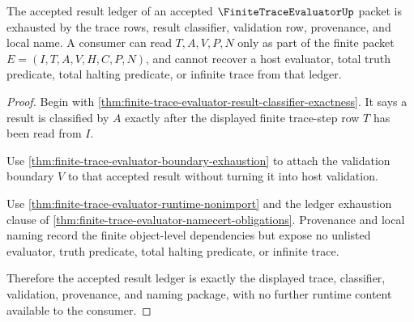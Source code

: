 \begin{theorem}
\label{thm:finite-trace-evaluator-accepted-result-ledger-exhaustion}
The accepted result ledger of an accepted $\FiniteTraceEvaluatorUp$ packet is
exhausted by the trace rows, result classifier, validation row, provenance,
and local name. A consumer can read $T,A,V,P,N$ only as part of the finite
packet $E=(I,T,A,V,H,C,P,N)$, and cannot recover a host evaluator, total truth
predicate, total halting predicate, or infinite trace from that ledger.
\end{theorem}
\begin{proof}
Begin with \autoref{thm:finite-trace-evaluator-result-classifier-exactness}.
It says a result is classified by $A$ exactly after the displayed finite
trace-step row $T$ has been read from $I$.

Use \autoref{thm:finite-trace-evaluator-boundary-exhaustion} to attach the
validation boundary $V$ to that accepted result without turning it into host
validation.

Use \autoref{thm:finite-trace-evaluator-runtime-nonimport} and the ledger
exhaustion clause of
\autoref{thm:finite-trace-evaluator-namecert-obligations}. Provenance and
local naming record the finite object-level dependencies but expose no
unlisted evaluator, truth predicate, total halting predicate, or infinite
trace.

Therefore the accepted result ledger is exactly the displayed trace,
classifier, validation, provenance, and naming package, with no further
runtime content available to the consumer.
\end{proof}

